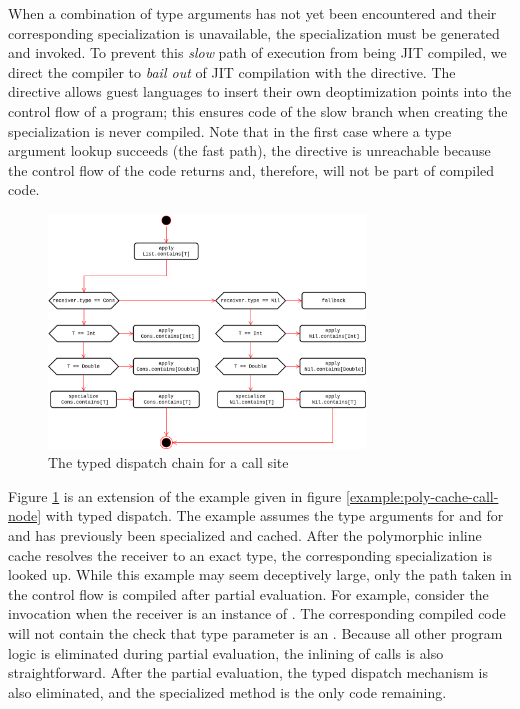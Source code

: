 When a combination of type arguments has not yet been encountered and their corresponding specialization is unavailable, the specialization must be generated and invoked.
To prevent this \textit{slow} path of execution from being JIT compiled, we direct the compiler to \textit{bail out} of JIT compilation with the  directive.
The directive allows guest languages to insert their own deoptimization points into the control flow of a program; this ensures code of the slow branch when creating the specialization is never compiled.
Note that in the first case where a type argument lookup succeeds (the fast path), the directive is unreachable because the control flow of the code returns and, therefore, will not be part of compiled code.

\begin{figure}[!htb]
	\centering
	\includegraphics[width=0.75\textwidth]{figures/tastytruffle-type-dispatch-chain.png}
	\caption{The typed dispatch chain for a  call site}
	\label{example:typed-dispatch}
\end{figure}

Figure \ref{example:typed-dispatch} is an extension of the example given in figure \ref{example:poly-cache-call-node} with typed dispatch.
The example assumes the type arguments for  and  for  and  has previously been specialized and cached.
After the polymorphic inline cache resolves the receiver to an exact type, the corresponding specialization is looked up.
While this example may seem deceptively large, only the path taken in the control flow is compiled after partial evaluation.
For example, consider the invocation  when the receiver is an instance of .
The corresponding compiled code will not contain the check that type parameter is an .
Because all other program logic is eliminated during partial evaluation, the inlining of calls is also straightforward.
After the partial evaluation, the typed dispatch mechanism is also eliminated, and the specialized method is the only code remaining.

